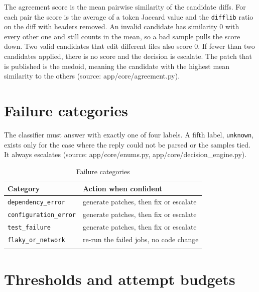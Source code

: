 The agreement score is the mean pairwise similarity of the candidate diffs. For each pair the score is the average of a token Jaccard value and the \texttt{difflib} ratio on the diff with headers removed. An invalid candidate has similarity 0 with every other one and still counts in the mean, so a bad sample pulls the score down. Two valid candidates that edit different files also score 0. If fewer than two candidates applied, there is no score and the decision is escalate. The patch that is published is the medoid, meaning the candidate with the highest mean similarity to the others (source: app/\allowbreak{}core/\allowbreak{}agreement.py).

\section{Failure categories}

The classifier must answer with exactly one of four labels. A fifth label, \texttt{unknown}, exists only for the case where the reply could not be parsed or the samples tied. It always escalates (source: app/\allowbreak{}core/\allowbreak{}enums.py, app/\allowbreak{}core/\allowbreak{}decision\_\allowbreak{}engine.py).

\begingroup\small
\begin{longtable}{>{\raggedright\arraybackslash}p{0.506\dimexpr\linewidth-4\tabcolsep\relax}>{\raggedright\arraybackslash}p{0.494\dimexpr\linewidth-4\tabcolsep\relax}}
\toprule
\rowcolor{gray!14}\textbf{Category} & \textbf{Action when confident} \\
\midrule
\endhead
\bottomrule
\endfoot
\endlastfoot
\texttt{dependency\_\allowbreak{}error} & generate patches, then fix or escalate \\
\texttt{configuration\_\allowbreak{}error} & generate patches, then fix or escalate \\
\texttt{test\_\allowbreak{}failure} & generate patches, then fix or escalate \\
\texttt{flaky\_\allowbreak{}or\_\allowbreak{}network} & re-run the failed jobs, no code change \\
\bottomrule
\caption{Failure categories}\label{tab:08-1}\\
\end{longtable}
\endgroup

\section{Thresholds and attempt budgets}

